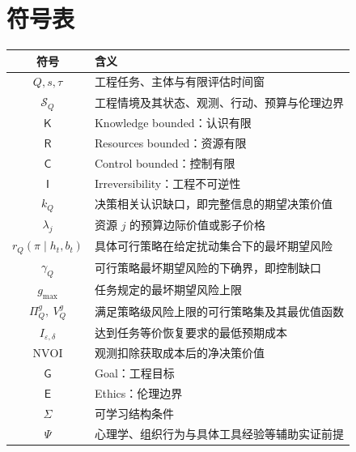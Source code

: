 \documentclass[11pt,a4paper]{ctexart}
\numberwithin{equation}{section}
\theoremstyle{definition}
\theoremstyle{plain}
\newcommand{\Know}{\mathsf{K}}
\newcommand{\Res}{\mathsf{R}}
\newcommand{\Ctrl}{\mathsf{C}}
\newcommand{\Info}{\mathsf{I}}
\newcommand{\Goal}{\mathsf{G}}
\newcommand{\Eth}{\mathsf{E}}
\newcommand{\Learn}{\Sigma}
\begin{document}
\section{符号表}

\begin{center}
\begin{tabular}{cl}
\toprule
符号 & 含义\\
\midrule
$Q,s,\tau$ & 工程任务、主体与有限评估时间窗\\
$\mathcal S_Q$ & 工程情境及其状态、观测、行动、预算与伦理边界\\
$\Know$ & Knowledge bounded：认识有限\\
$\Res$ & Resources bounded：资源有限\\
$\Ctrl$ & Control bounded：控制有限\\
$\Info$ & Irreversibility：工程不可逆性\\
$k_Q$ & 决策相关认识缺口，即完整信息的期望决策价值\\
$\lambda_j$ & 资源 $j$ 的预算边际价值或影子价格\\
$r_Q(\pi\mid h_t,b_t)$ & 具体可行策略在给定扰动集合下的最坏期望风险\\
$\gamma_Q$ & 可行策略最坏期望风险的下确界，即控制缺口\\
$g_{\max}$ & 任务规定的最坏期望风险上限\\
$\Pi_Q^g,\ V_Q^g$ & 满足策略级风险上限的可行策略集及其最优值函数\\
$I_{\varepsilon,\delta}$ & 达到任务等价恢复要求的最低预期成本\\
$\operatorname{NVOI}$ & 观测扣除获取成本后的净决策价值\\
$\Goal$ & Goal：工程目标\\
$\Eth$ & Ethics：伦理边界\\
$\Learn$ & 可学习结构条件\\
$\Psi$ & 心理学、组织行为与具体工具经验等辅助实证前提\\
\bottomrule
\end{tabular}
\end{center}
\end{document}

